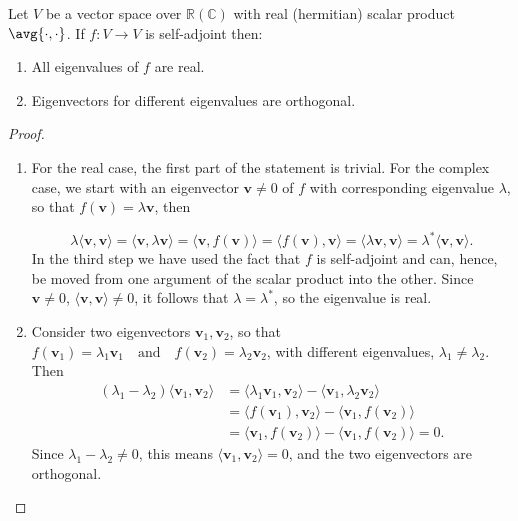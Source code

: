 \documentclass[a4paper,12pt]{report}
\begin{document}
\begin{theorem}
Let \(V\) be a vector space over \(\mathbb{R} (\mathbb{C})\) with real (hermitian) scalar product \(\avg{\cdot ,\cdot } \). If \(f: V \rightarrow V\) is self-adjoint then:

\begin{enumerate}[label=(\(P\)\arabic*)]
    \item All eigenvalues of \(f\) are real.
    \item Eigenvectors for different eigenvalues are orthogonal.
\end{enumerate}
   
\end{theorem}

\begin{proof}
\begin{enumerate}[label=(\(P\)\arabic*)]
    \item For the real case, the first part of the statement is trivial. For the complex case, we start with an eigenvector \( \mathbf{v} \neq 0 \) of \( f \) with corresponding eigenvalue \( \lambda \), so that \(f(\mathbf{v}) = \lambda \mathbf{v}\), then

    \begin{equation}
        \lambda \langle \mathbf{v}, \mathbf{v} \rangle 
        = \langle \mathbf{v}, \lambda \mathbf{v} \rangle 
        = \langle \mathbf{v}, f(\mathbf{v}) \rangle 
        = \langle f(\mathbf{v}), \mathbf{v} \rangle 
        = \langle \lambda \mathbf{v}, \mathbf{v} \rangle 
        = \lambda^* \langle \mathbf{v}, \mathbf{v} \rangle.
    \end{equation}
    In the third step we have used the fact that \( f \) is self-adjoint and can, hence, be moved from one argument of the scalar product into the other. Since \( \mathbf{v} \neq 0 \), \( \langle \mathbf{v}, \mathbf{v} \rangle \neq 0 \), it follows that \( \lambda = \lambda^* \), so the eigenvalue is real.
    
    \item Consider two eigenvectors \( \mathbf{v}_1, \mathbf{v}_2 \), so that \(f(\mathbf{v}_1) = \lambda_1 \mathbf{v}_1 \quad \text{and} \quad f(\mathbf{v}_2) = \lambda_2 \mathbf{v}_2\), with different eigenvalues, \( \lambda_1 \neq \lambda_2 \). Then
    \begin{equation}
        \begin{aligned} 
        (\lambda_1 - \lambda_2) \langle \mathbf{v}_1, \mathbf{v}_2 \rangle 
        &= \langle \lambda_1 \mathbf{v}_1, \mathbf{v}_2 \rangle 
        - \langle \mathbf{v}_1, \lambda_2 \mathbf{v}_2 \rangle \\
        &= \langle f(\mathbf{v}_1), \mathbf{v}_2 \rangle 
        - \langle \mathbf{v}_1, f(\mathbf{v}_2) \rangle \\
        &= \langle \mathbf{v}_1, f(\mathbf{v}_2) \rangle - \langle \mathbf{v}_1, f(\mathbf{v}_2) \rangle
        = 0.
        \end{aligned} 
    \end{equation}
    Since \( \lambda_1 - \lambda_2 \neq 0 \), this means \( \langle \mathbf{v}_1, \mathbf{v}_2 \rangle = 0 \), and the two eigenvectors are orthogonal.
\end{enumerate}


\end{proof}
\end{document}
